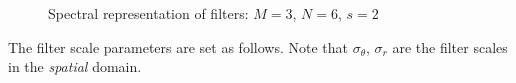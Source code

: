 \documentclass[12pt,a4]{article}
\begin{document}
\begin{figure}[t]\centering
  \hspace{2em}
  \caption{Spectral representation of filters: $M=3$, $N=6$, $s=2$\label{fig:spectra}}
\end{figure}

The filter scale parameters are set as follows.  Note that $\sigma_\theta$, $\sigma_r$ are the filter scales in the {\em spatial} domain.  
\end{document}
